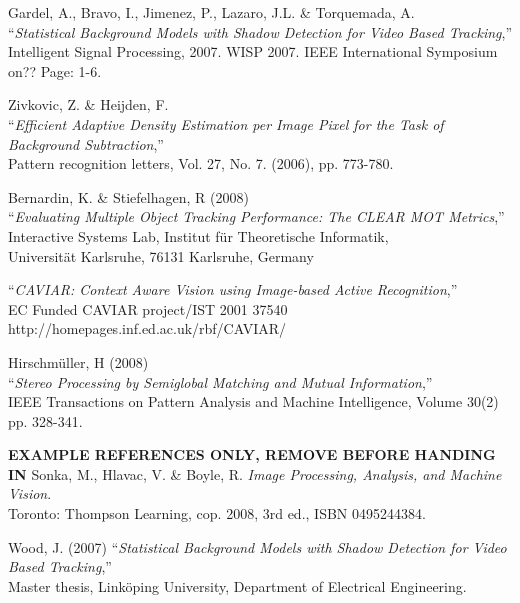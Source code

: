 \begin{thebibliography}{9}

	Gardel, A., Bravo, I., Jimenez, P., Lazaro, J.L. \& Torquemada, A.\\
	``\textit{Statistical Background Models with Shadow Detection for Video Based Tracking},''\\ Intelligent Signal Processing, 2007. WISP 2007. IEEE International Symposium on?? Page: 1-6.
	
	Zivkovic, Z. \& Heijden, F.\\
	``\textit{Efficient Adaptive Density Estimation per Image Pixel for the Task of Background Subtraction},''\\
	Pattern recognition letters, Vol. 27, No. 7. (2006), pp. 773-780.

	Bernardin, K. \& Stiefelhagen, R (2008)\\
	``\textit{Evaluating Multiple Object Tracking Performance: The CLEAR MOT Metrics},''\\
	Interactive Systems Lab, Institut für Theoretische Informatik,\\
	Universität Karlsruhe, 76131 Karlsruhe, Germany
	
	``\textit{CAVIAR: Context Aware Vision using Image-based Active Recognition},''\\
	EC Funded CAVIAR project/IST 2001 37540\\
	http://homepages.inf.ed.ac.uk/rbf/CAVIAR/
	
	Hirschmüller, H (2008)\\
	``\textit{Stereo Processing by Semiglobal Matching and Mutual Information},''\\
	IEEE Transactions on Pattern Analysis and Machine Intelligence, Volume 30(2)
	pp. 328-341.
	
\vspace{2cm}
\LARGE{\textbf{EXAMPLE REFERENCES ONLY, REMOVE BEFORE HANDING IN}}
\normalsize
{}
	Sonka, M., Hlavac, V. \& Boyle, R. 
	\emph{Image Processing, Analysis, and Machine Vision}.\\
	Toronto: Thompson Learning,
	cop. 2008, 3rd ed.,
	ISBN 0495244384.
	
	Wood, J. (2007)
	``\textit{Statistical Background Models with Shadow Detection for Video Based Tracking},''\\
	Master thesis, Linköping University, Department of Electrical Engineering.	


\end{thebibliography}
